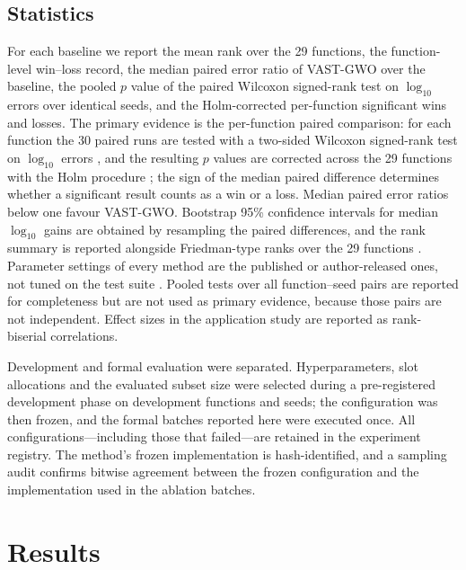 \documentclass[11pt,a4paper]{article}
\newcommand{\method}{VAST-GWO}
\begin{document}
\subsection{Statistics}
For each baseline we report the mean rank over the 29 functions, the
function-level win--loss record, the median paired error ratio of \method{}
over the baseline, the pooled $p$ value of the paired Wilcoxon signed-rank test
on $\log_{10}$ errors over identical seeds, and the Holm-corrected per-function
significant wins and losses. The primary evidence is the per-function paired
comparison: for each function the 30 paired runs are tested with a two-sided
Wilcoxon signed-rank test on $\log_{10}$ errors \citep{wilcoxon1945}, and the
resulting $p$ values are corrected across the 29 functions with the Holm
procedure \citep{garcia2010advanced}; the sign of the
median paired difference determines whether a significant result counts as a
win or a loss. Median paired error ratios below one favour \method.
Bootstrap 95\% confidence intervals for median $\log_{10}$ gains are obtained
by resampling the paired differences, and the rank summary is reported
alongside Friedman-type ranks over the 29 functions
\citep{friedman1937,garcia2010advanced}. Parameter settings of every method are
the published or author-released ones, not tuned on the test suite
\citep{eiben2011parameter}. Pooled tests over all function--seed
pairs are reported for completeness but are not used as primary evidence,
because those pairs are not independent. Effect sizes in the application study
are reported as rank-biserial correlations.

Development and formal evaluation were separated. Hyperparameters, slot
allocations and the evaluated subset size were selected during a
pre-registered development phase on development functions and seeds; the
configuration was then frozen, and the formal batches reported here were
executed once. All configurations---including those that failed---are retained
in the experiment registry. The method's frozen implementation is
hash-identified, and a sampling audit confirms bitwise agreement between the
frozen configuration and the implementation used in the ablation batches.

\section{Results}
\label{sec:results}
\end{document}
